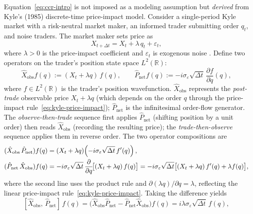 Equation~\eqref{eq:ccr-intro} is not imposed as a modeling assumption but
\emph{derived} from Kyle's (1985) discrete-time price-impact model.
Consider a single-period Kyle market with a risk-neutral market maker, an
informed trader submitting order $q_t$, and noise traders. The market maker
sets price as
\begin{equation}\label{eq:kyle-price-impact}
    X_{t+\Delta t} = X_t + \lambda \, q_t + \varepsilon_t,
\end{equation}
where $\lambda > 0$ is the price-impact coefficient and $\varepsilon_t$ is
exogenous noise \citep{kyle1985continuous}. Define two operators on the
trader's position state space $L^2(\mathbb{R})$:
\begin{equation}\label{eq:ops-def}
    \hat{X}_{\mathrm{obs}} f(q) := (X_t + \lambda q)\, f(q), \qquad
    \hat{P}_{\mathrm{net}} f(q) := -i\sigma_\varepsilon\sqrt{\Delta t}
    \,\frac{\partial f}{\partial q}(q),
\end{equation}
where $f \in L^2(\mathbb{R})$ is the trader's position wavefunction.
$\hat{X}_{\mathrm{obs}}$ represents the \emph{post-trade} observable price
$X_t + \lambda q$ (which depends on the order $q$ through the price-impact
rule~\eqref{eq:kyle-price-impact}); $\hat{P}_{\mathrm{net}}$ is the
infinitesimal order-flow generator. The \emph{observe-then-trade} sequence
first applies $\hat{P}_{\mathrm{net}}$ (shifting position by a unit order)
then reads $\hat{X}_{\mathrm{obs}}$ (recording the resulting price); the
\emph{trade-then-observe} sequence applies them in reverse order.
The two operator compositions are
\begin{align}
    (\hat{X}_{\mathrm{obs}}\,\hat{P}_{\mathrm{net}}) f(q)
    &= (X_t + \lambda q)\!\left(-i\sigma_\varepsilon\sqrt{\Delta t}\,f'(q)\right), \notag\\
    (\hat{P}_{\mathrm{net}}\,\hat{X}_{\mathrm{obs}}) f(q)
    &= -i\sigma_\varepsilon\sqrt{\Delta t}\,\frac{\partial}{\partial q}
       \!\bigl[(X_t + \lambda q)\,f(q)\bigr]
    = -i\sigma_\varepsilon\sqrt{\Delta t}\bigl[(X_t + \lambda q)\,f'(q)
       + \lambda f(q)\bigr],
    \label{eq:composition}
\end{align}
where the second line uses the product rule and $\partial(\lambda q)/\partial q
= \lambda$, reflecting the linear price-impact rule~\eqref{eq:kyle-price-impact}.
Taking the difference yields
\begin{equation}\label{eq:ccr-derivation}
    [\hat{X}_{\mathrm{obs}},\,\hat{P}_{\mathrm{net}}]\,f(q)
    = \bigl(\hat{X}_{\mathrm{obs}}\hat{P}_{\mathrm{net}}
      - \hat{P}_{\mathrm{net}}\hat{X}_{\mathrm{obs}}\bigr)f(q)
    = i\lambda\sigma_\varepsilon\sqrt{\Delta t}\,f(q),
\end{equation}
